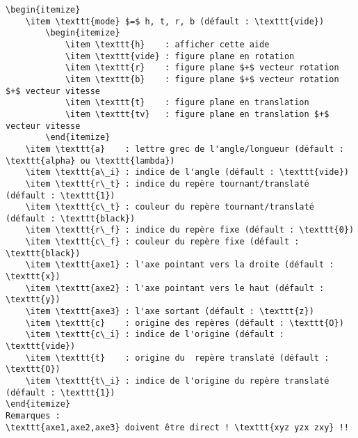 \documentclass[a4paper,9pt]{article}
\begin{document}
\begin{verbatim}
\begin{itemize}
    \item \texttt{mode} $=$ h, t, r, b (défault : \texttt{vide})
        \begin{itemize}
            \item \texttt{h}    : afficher cette aide
            \item \texttt{vide} : figure plane en rotation
            \item \texttt{r}    : figure plane $+$ vecteur rotation
            \item \texttt{b}    : figure plane $+$ vecteur rotation $+$ vecteur vitesse
            \item \texttt{t}    : figure plane en translation
            \item \texttt{tv}   : figure plane en translation $+$ vecteur vitesse
        \end{itemize}
    \item \texttt{a}    : lettre grec de l'angle/longueur (défault : \texttt{alpha} ou \texttt{lambda})
    \item \texttt{a\_i} : indice de l'angle (défault : \texttt{vide})
    \item \texttt{r\_t} : indice du repère tournant/translaté  (défault : \texttt{1})
    \item \texttt{c\_t} : couleur du repère tournant/translaté (défault : \texttt{black})
    \item \texttt{r\_f} : indice du repère fixe (défault : \texttt{0})
    \item \texttt{c\_f} : couleur du repère fixe (défault : \texttt{black})
    \item \texttt{axe1} : l'axe pointant vers la droite (défault : \texttt{x})
    \item \texttt{axe2} : l'axe pointant vers le haut (défault : \texttt{y})
    \item \texttt{axe3} : l'axe sortant (défault : \texttt{z})
    \item \texttt{c}    : origine des repères (défault : \texttt{O})
    \item \texttt{c\_i} : indice de l'origine (défault : \texttt{vide})
    \item \texttt{t}    : origine du  repère translaté (défault : \texttt{O})
    \item \texttt{t\_i} : indice de l'origine du repère translaté  (défault : \texttt{1})
\end{itemize}
Remarques : 
\texttt{axe1,axe2,axe3} doivent être direct ! \texttt{xyz yzx zxy} !!

\end{verbatim}
\end{document}
